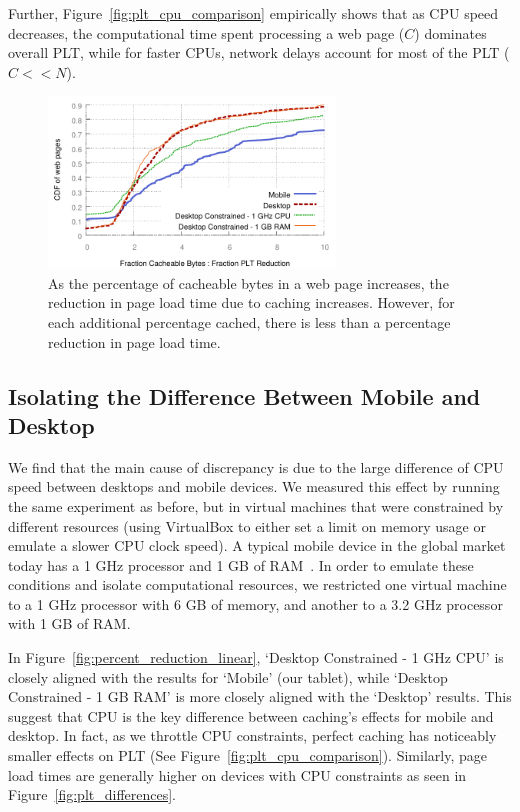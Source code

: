 Further, Figure~\ref{fig:plt_cpu_comparison} empirically shows that as CPU speed decreases, the computational time spent processing a web page ($C$) dominates overall PLT, while for faster CPUs, network delays account for most of the PLT ($ C << N $).

\begin{figure}[t]
    \includegraphics[width=3in]{../graphs/ratio_bytes_to_reduction/ratio_linear_comparison.pdf}
    \caption[]{\label{fig:ratio_linear_comparison}As the percentage of cacheable bytes in a web page increases, the reduction in page load time due to caching increases. However, for each additional percentage cached, there is less than a percentage reduction in page load time.}
\end{figure}
\subsection{Isolating the Difference Between Mobile and Desktop}

We find that the main cause of discrepancy is due to the large difference of CPU speed between desktops and mobile devices. 
We measured this effect by running the same experiment as before, but in virtual machines that were constrained by different resources (using VirtualBox to either set a limit on memory usage or emulate a slower CPU clock speed).
A typical mobile device in the global market today has a 1 GHz processor and 1 GB of RAM~\cite{mobile-stats}. In order to emulate these conditions and isolate computational resources, we restricted one virtual machine to a 1 GHz processor with 6 GB of memory, and another to a 3.2 GHz processor with 1 GB of RAM.

In Figure~\ref{fig:percent_reduction_linear}, `Desktop Constrained - 1 GHz CPU' is closely aligned with the results for `Mobile' (our tablet), while `Desktop Constrained - 1 GB RAM' is more closely aligned with the `Desktop' results.
This suggest that CPU is the key difference between caching's effects for mobile and desktop.
In fact, as we throttle CPU constraints, perfect caching has noticeably smaller effects on PLT (See Figure~\ref{fig:plt_cpu_comparison}). Similarly, page load times are generally higher on devices with CPU constraints as seen in Figure~\ref{fig:plt_differences}.

